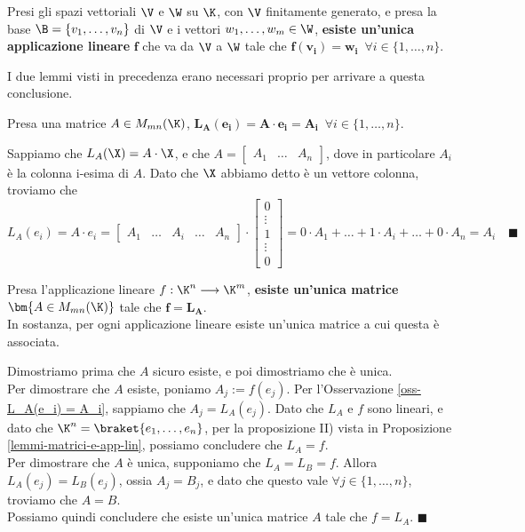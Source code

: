 \documentclass[11pt, a4paper, titlepage, oneside]{scrbook}
\begin{document}
\begin{Proposizione}[Corollario]
\label{corollario-applicazioni-lineari-matrici}
Presi gli spazi vettoriali $\V$ e $\W$ su $\K$, con $\V$ finitamente generato, e presa la base $\B = \{v_1, \ldots, v_n\}$ di $\V$ e i vettori $w_1, \ldots, w_m \in \W$, \textbf{esiste un'unica applicazione lineare} $\bm{f}$ che va da $\V$ a $\W$ tale che $\bm{f(v_i) = w_i} \enspace \forall i \in \{1, \ldots, n\}$.
\end{Proposizione}

I due lemmi visti in precedenza erano necessari proprio per arrivare a questa conclusione.

\begin{Osservazione}[]
\label{oss-L_A(e_i) = A_i}
Presa una matrice $A \in M_{mn}(\K)$, $\bm{L_A(e_i) = A \cdot e_i =  A_i} \enspace \forall i \in \{1, \ldots, n\}$.
\end{Osservazione}

\Dimostrazione \nopagebreak

Sappiamo che $L_A(\X) = A \cdot \X$, e che $A = \begin{bmatrix}
    A_1 & \dots & A_n
\end{bmatrix}$, dove in particolare $A_i$ è la colonna i-esima di $A$. Dato che $\X$ abbiamo detto è un vettore colonna, troviamo che 
\[L_A(e_i) = A \cdot e_i = \begin{bmatrix}
    A_1 & \dots & A_i & \dots & A_n
\end{bmatrix} \cdot \begin{bmatrix}
    0 \\ \vdots \\ 1 \\ \vdots \\ 0
\end{bmatrix} = 0 \cdot A_1 + \ldots + 1 \cdot A_i + \ldots + 0 \cdot A_n = A_i \quad \blacksquare\] 

\begin{Proposizione}[]
\label{propos-unica-appl-lin-ass-a-matrice}
Presa l'applicazione lineare $f: \K^n \longrightarrow \K^m$, \textbf{esiste un'unica matrice} $\bm{A \in M_{mn}(\K)}$ tale che $\bm{f = L_A}$. \\
In sostanza, per ogni applicazione lineare esiste un'unica matrice a cui questa è associata.
\end{Proposizione}

\Dimostrazione \nopagebreak

Dimostriamo prima che $A$ sicuro esiste, e poi dimostriamo che è unica. \\
Per dimostrare che $A$ esiste, poniamo $A_j := f(e_j)$. Per l'Osservazione \ref{oss-L_A(e_i) = A_i}, sappiamo che $A_j = L_A(e_j)$. Dato che $L_A$ e $f$ sono lineari, e dato che $\K^n = \braket{e_1, \ldots, e_n}$, per la proposizione II) vista in Proposizione \ref{lemmi-matrici-e-app-lin}, possiamo concludere che $L_A = f$. \\
Per dimostrare che $A$ è unica, supponiamo che $L_A = L_B = f$. Allora $L_A(e_j) = L_B(e_j)$, ossia $A_j = B_j$, e dato che questo vale $\forall j \in \{1, \ldots, n\}$, troviamo che $A = B$. \\
Possiamo quindi concludere che esiste un'unica matrice $A$ tale che $f = L_A$. $\blacksquare$
\end{document}
